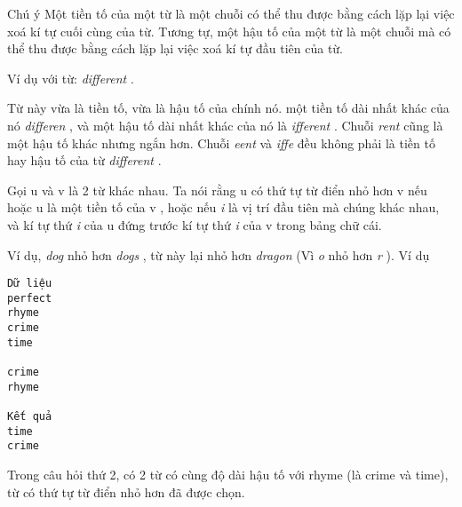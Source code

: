 Chú ý  
Một tiền tố của một từ là một chuỗi có thể thu được bằng cách lặp lại việc xoá kí tự cuối cùng của từ. Tương tự, một hậu tố của một từ là một chuỗi mà có thể thu được bằng cách lặp lại việc xoá kí tự đầu tiên của từ.  

   Ví dụ với từ:   \textit{    different   }   .  

   Từ này vừa là tiền tố, vừa là hậu tố của chính nó. một tiền tố dài nhất khác của nó   \textit{    differen   }   , và một hậu tố dài nhất khác của nó là   \textit{    ifferent   }   . Chuỗi   \textit{    rent   }   cũng là một hậu tố khác nhưng ngắn hơn. Chuỗi   \textit{    eent   }   và   \textit{    iffe   }   đều không phải là tiền tố hay hậu tố của từ   \textit{    different   }   .  

   Gọi       u      và       v      là 2 từ khác nhau. Ta nói rằng       u      có thứ tự từ điển nhỏ hơn       v      nếu hoặc       u      là một tiền tố của       v      , hoặc nếu   \textit{    i   }   là vị trí đầu tiên mà chúng khác nhau, và kí tự thứ   \textit{    i   }   của       u      đứng trước kí tự thứ   \textit{    i   }   của       v      trong bảng chữ cái.  

   Ví dụ,   \textit{    dog   }   nhỏ hơn   \textit{    dogs   }   , từ này lại nhỏ hơn   \textit{    dragon   }   (Vì   \textit{    o   }   nhỏ hơn   \textit{    r   }   ).
   Ví dụ  
\begin{verbatim}
Dữ liệu
perfect
rhyme
crime
time

crime
rhyme

Kết quả
time
crime
\end{verbatim}

   Trong câu hỏi thứ 2, có 2 từ có cùng độ dài hậu tố với rhyme (là crime và time), từ có thứ tự từ điển nhỏ hơn đã được chọn.